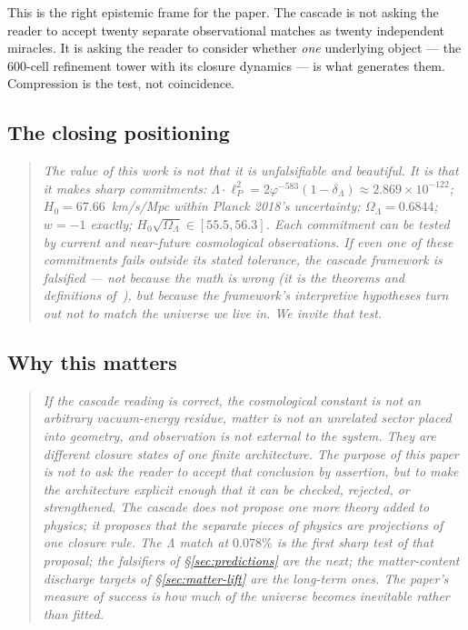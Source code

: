\documentclass[11pt]{article}
\theoremstyle{plain}
\theoremstyle{definition}
\theoremstyle{remark}
\begin{document}
This is the right epistemic frame for the paper. The cascade is not asking the reader to accept twenty separate observational matches as twenty independent miracles. It is asking the reader to consider whether \emph{one} underlying object --- the 600-cell refinement tower with its closure dynamics --- is what generates them. Compression is the test, not coincidence.

\subsection{The closing positioning}

\begin{quote}
\textit{The value of this work is not that it is unfalsifiable and beautiful. It is that it makes sharp commitments: $\Lambda \cdot \ell_P^2 = 2 \varphi^{-583}(1 - \delta_\Lambda) \approx 2.869 \times 10^{-122}$; $H_0 = 67.66$~km/s/Mpc within Planck 2018's uncertainty; $\Omega_\Lambda = 0.6844$; $w = -1$ exactly; $H_0 \sqrt{\Omega_\Lambda} \in [55.5, 56.3]$. Each commitment can be tested by current and near-future cosmological observations. If even one of these commitments fails outside its stated tolerance, the cascade framework is falsified --- not because the math is wrong (it is the theorems and definitions of~\citealp{SmartXXXVI}), but because the framework's interpretive hypotheses turn out not to match the universe we live in. We invite that test.}
\end{quote}

\subsection{Why this matters}\label{sec:discussion-why}

\begin{quote}
\textit{If the cascade reading is correct, the cosmological constant is not an arbitrary vacuum-energy residue, matter is not an unrelated sector placed into geometry, and observation is not external to the system. They are different closure states of one finite architecture. The purpose of this paper is not to ask the reader to accept that conclusion by assertion, but to make the architecture explicit enough that it can be checked, rejected, or strengthened. The cascade does not propose one more theory added to physics; it proposes that the separate pieces of physics are projections of one closure rule. The Λ match at $0.078\%$ is the first sharp test of that proposal; the falsifiers of \S\ref{sec:predictions} are the next; the matter-content discharge targets of \S\ref{sec:matter-lift} are the long-term ones. The paper's measure of success is how much of the universe becomes inevitable rather than fitted.}
\end{quote}
\end{document}
